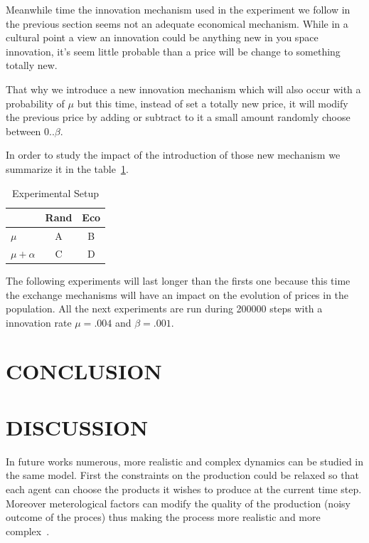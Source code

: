 \documentclass{wscpaperproc}
\begin{document}
Meanwhile time the innovation mechanism used in the experiment  we follow in the previous section seems not  an adequate economical mechanism. While in a cultural point a view an innovation could be anything new in you space innovation, it's seem little probable than a price will be change to something totally new. 

That why we  introduce a new innovation mechanism which will also occur with a probability of $\mu$ but this time, instead of set a totally new price, it will modify the previous price by adding or subtract to it a small amount randomly choose between $0 .. \beta$.


In order to study the impact of the introduction of those new mechanism  we summarize it in the table~\ref{tab:exp}. 
\begin{table}
	\centering
	\begin{tabular}{l|c|c}
		& Rand & Eco \\\hline
		$\mu$ &A & B \\
		$\mu +\alpha$ & C & D \\
	\end{tabular}
	\caption{Experimental Setup}
	\label{tab:exp}
\end{table}


The following  experiments will last longer than the firsts one because this time the exchange mechanisms will have an impact on the evolution of prices in the population. All the next experiments are run during 200000 steps with a innovation rate $\mu=.004$ and $\beta=.001$.



\section{CONCLUSION}

\section{DISCUSSION}


In future works numerous, more realistic and complex dynamics can be studied in the same model. First the constraints on the production could be relaxed so that each agent can choose the products it wishes to produce at the current time step. Moreover meterological factors can modify the quality of the production (noisy outcome of the proces) thus making the process more realistic and more complex~\cite{bentley_specialisation_2005}.
\end{document}
